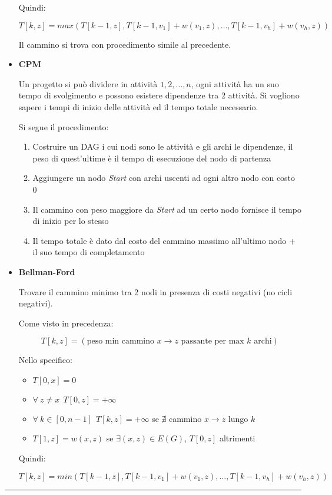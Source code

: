 \documentclass{article}
\begin{document}
\begin{itemize}
            Quindi:
    
            $$T[k,z]=max(T[k-1,z],T[k-1,v_1]+w(v_1,z),\ldots,T[k-1,v_h]+w(v_h,z))$$\newline
    
            Il cammino si trova con procedimento simile al precedente.

        \item \textbf{CPM}

            Un progetto si può dividere in attività $1,2,\ldots,n$, ogni attività ha un suo tempo di svolgimento e possono esistere dipendenze tra 2 attività. Si vogliono sapere i tempi di inizio delle attività ed il tempo totale necessario.\newline

            Si segue il procedimento:
            \begin{enumerate}
                \item Costruire un DAG i cui nodi sono le attività e gli archi le dipendenze, il peso di quest'ultime è il tempo di esecuzione del nodo di partenza
                \item Aggiungere un nodo \textit{Start} con archi uscenti ad ogni altro nodo con costo 0
                \item Il cammino con peso maggiore da \textit{Start} ad un certo nodo fornisce il tempo di inizio per lo stesso
                \item Il tempo totale è dato dal costo del cammino massimo all'ultimo nodo + il suo tempo di completamento
            \end{enumerate}

        \newpage

        \item \textbf{Bellman-Ford}

            Trovare il cammino minimo tra 2 nodi in presenza di costi negativi (no cicli negativi).\newline

            Come visto in precedenza:

            $$T[k,z]=(\text{peso min cammino $x\rightarrow z$ passante per max $k$ archi})$$\newline

            Nello specifico:
            \begin{itemize}
                \item $T[0,x]=0$
                \item $\forall\ z\neq x\ \ T[0,z]=+\infty$
                \item $\forall\ k\in[0,n-1]\ \ T[k,z]=+\infty$ se $\nexists$ cammino $x\rightarrow z$ lungo $k$
                \item $T[1,z]=w(x,z)$ se $\exists(x,z)\in E(G)$, $T[0,z]$ altrimenti\newline
            \end{itemize}

            Quindi:
    
            $$T[k,z]=min(T[k-1,z],T[k-1,v_1]+w(v_1,z),\ldots,T[k-1,v_h]+w(v_h,z))$$
    
\end{itemize}


\noindent\rule{\textwidth}{0.5pt}
\end{document}
